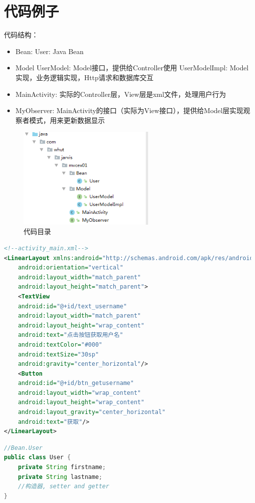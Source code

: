 \documentclass[a4paper,12pt]{ctexart}
\begin{document}
	 \section{代码例子}
	 代码结构：
	 \begin{itemize}
	 	\item Bean:
	 	\subitem User: Java Bean
	 	\item Model
	 	\subitem UserModel: Model接口，提供给Controller使用
	 	\subitem UserModelImpl: Model实现，业务逻辑实现，Http请求和数据库交互
	 	\item MainActivity: 实际的Controller层，View层是xml文件，处理用户行为
	 	\item MyObserver: MainActivity的接口（实际为View接口），提供给Model层实现观察者模式，用来更新数据显示
	 \end{itemize}
	 \begin{figure}[!h]
	 	\centering
	 	\includegraphics[width=0.6\textwidth]{image/6.png}
	 	\caption{代码目录}
	 \end{figure}
\begin{lstlisting}[language=xml]
<!--activity_main.xml-->
<LinearLayout xmlns:android="http://schemas.android.com/apk/res/android"
	android:orientation="vertical"
	android:layout_width="match_parent"
	android:layout_height="match_parent">
	<TextView
	android:id="@+id/text_username"
	android:layout_width="match_parent"
	android:layout_height="wrap_content"
	android:text="点击按钮获取用户名"
	android:textColor="#000"
	android:textSize="30sp"
	android:gravity="center_horizontal"/>
	<Button
	android:id="@+id/btn_getusername"
	android:layout_width="wrap_content"
	android:layout_height="wrap_content"
	android:layout_gravity="center_horizontal"
	android:text="获取"/>
</LinearLayout>
\end{lstlisting}
 	\begin{lstlisting}[language=java]
//Bean.User
public class User {
	private String firstname;
	private String lastname;
	//构造器, setter and getter
}
 	\end{lstlisting}
\end{document}
